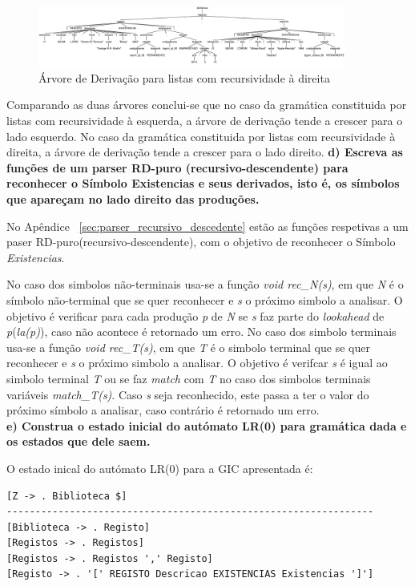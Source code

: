 \begin{figure}[!h]
	\centering
    \includegraphics[width=0.9\textwidth]{./imagens/alineac.png}
    \caption{Árvore de Derivação para listas com recursividade à direita}
    \label{fig:alinea_c}
\end{figure}
Comparando as duas árvores conclui-se que no caso da gramática constituida por listas com recursividade à esquerda, a árvore de derivação tende a crescer para o lado esquerdo. No caso da gramática constituida por listas com recursividade à direita, a árvore de derivação tende a crescer para o lado direito.
\newpage
\textbf{d) Escreva as funções de um parser RD-puro (recursivo-descendente) para reconhecer o Símbolo Existencias e seus derivados, isto é, os símbolos que apareçam no lado direito das produções.}\\
\label{sub:alinea_d}

No Apêndice ~\ref{sec:parser_recursivo_descedente} estão as funções respetivas a um paser RD-puro(recursivo-descendente), com o objetivo de reconhecer o Símbolo \emph{Existencias}.

No caso dos simbolos não-terminais usa-se a função \emph{void rec\_N(s)}, em que \emph{N} é o símbolo não-terminal que se quer reconhecer e \emph{s} o próximo simbolo a analisar. O objetivo é verificar para cada produção \emph{p} de \emph{N} se \emph{s} faz parte do \emph{lookahead} de \emph{p}(\emph{la(p)}), caso não acontece é retornado um erro.
No caso dos simbolo terminais usa-se a função \emph{void rec\_T(s)}, em que \emph{T} é o simbolo terminal que se quer reconhecer e \emph{s} o próximo simbolo a analisar. O objetivo é verifcar \emph{s} é igual ao simbolo terminal \emph{T} ou se faz \emph{match} com \emph{T} no caso dos simbolos terminais variáveis \emph{match\_T(s)}. Caso \emph{s} seja reconhecido, este passa a ter o valor do próximo símbolo a analisar, caso contrário é retornado um erro.
\\
\textbf{e) Construa o estado inicial do autómato LR(0) para gramática dada e os estados que dele saem.}\\
\label{sub:alinea_e}

O estado inical do autómato LR(0) para a GIC apresentada é:

\begin{verbatim}
[Z -> . Biblioteca $]
----------------------------------------------------------------
[Biblioteca -> . Registo]
[Registos -> . Registos]
[Registos -> . Registos ',' Registo]
[Registo -> . '[' REGISTO Descricao EXISTENCIAS Existencias ']']
\end{verbatim}

